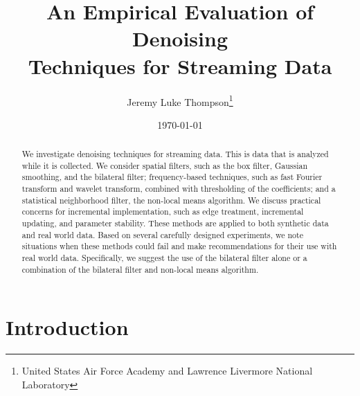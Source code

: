 \documentclass[11pt]{article}
\theoremstyle{definition}
\begin{document}
\title{An Empirical Evaluation of Denoising\\Techniques for Streaming Data}

\date{\today}

%

\author{Jeremy Luke Thompson\thanks{United States Air Force Academy and Lawrence Livermore National Laboratory}}


\maketitle


\begin{abstract}
  We investigate denoising techniques for streaming data. This is
  data that is analyzed while it is collected. We consider
  spatial filters, such as the box filter, Gaussian smoothing, and the
  bilateral filter; frequency-based techniques, such as fast Fourier
  transform and wavelet transform, combined with thresholding of the
  coefficients; and a statistical neighborhood filter, the non-local
  means algorithm. We discuss practical concerns for incremental
  implementation, such as edge treatment, incremental
  updating, and parameter stability. These methods are
  applied to both synthetic data and real world data. Based on several
  carefully designed experiments, we note situations when these
  methods could fail and make recommendations for their use with real
  world data. Specifically, we suggest the use of the bilateral filter
  alone or a combination of the bilateral filter and non-local means algorithm.
\end{abstract}



\clearpage


\tableofcontents
\thispagestyle{empty}

\clearpage

\pagestyle{plain}




 
\section{Introduction}
\end{document}
